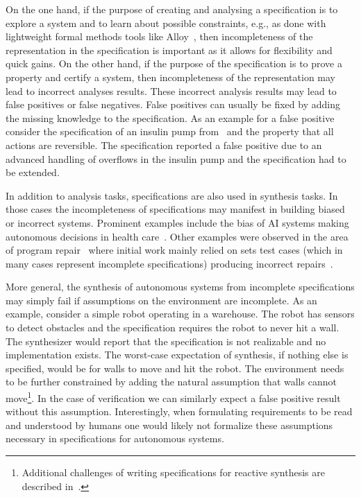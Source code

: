 \documentclass[sigconf]{acmart}
\begin{document}
On the one hand, if the purpose of creating and analysing a specification is to explore a system and to learn about possible constraints, e.g., as done with lightweight formal methods tools like Alloy~\cite{Jackson19}, then incompleteness of the representation in the specification is important as it allows for flexibility and quick gains. On the other hand, if the purpose of the specification is to prove a property and certify a system, then incompleteness of the representation may lead to incorrect analyses results. These incorrect analysis results may lead to false positives or false negatives. False positives can usually be fixed by adding the missing knowledge to the specification. As an example for a false positive consider the specification of an insulin pump from~\cite{HarrisonMCC17} and the property that all actions are reversible. The specification reported a false positive due to an advanced handling of overflows in the insulin pump and the specification had to be extended.

In addition to analysis tasks, specifications are also used in synthesis tasks. In those cases the incompleteness of specifications may manifest in building biased or incorrect systems. Prominent examples include the bias of AI systems making autonomous decisions in health care~\cite{science.aax2342}. Other examples were observed in the area of program repair~\cite{GazzolaMM19} where initial work mainly relied on sets test cases (which in many cases represent incomplete specifications) producing incorrect repairs~\cite{QiLAR15,SmithBGB15}. 

More general, the synthesis of autonomous systems from incomplete specifications may simply fail if assumptions on the environment are incomplete. As an example, consider a simple robot operating in a warehouse. The robot has sensors to detect obstacles and the specification requires the robot to never hit a wall. The synthesizer would report that the specification is not realizable and no implementation exists. The worst-case expectation of synthesis, if nothing else is specified, would be for walls to move and hit the robot. The environment needs to be further constrained by adding the natural assumption that walls cannot move\footnote{Additional challenges of writing specifications for reactive synthesis are described in~\cite{MaozR18}.}. In the case of verification we can similarly expect a false positive result without this assumption. 
Interestingly, when formulating requirements to be read and understood by humans one would likely not formalize these assumptions necessary in specifications for autonomous systems. 
\end{document}
